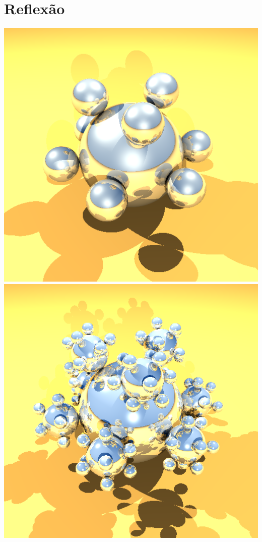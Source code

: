 \documentclass{article}
\begin{document}
    \section*{Reflexão}
        \begin{center}
            \includegraphics[scale=0.27]{deez_low}
            \includegraphics[scale=0.27]{deez_med} 

\end{center}
\end{document}
